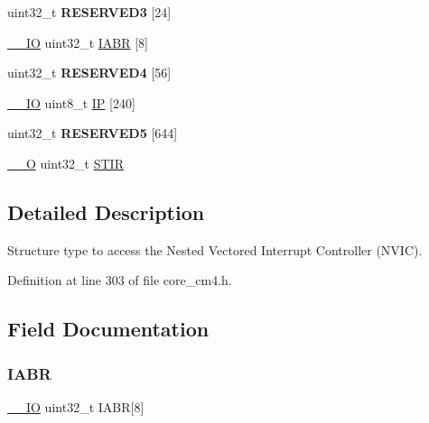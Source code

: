 \begin{DoxyCompactItemize}
\item 
\mbox{\label{struct_n_v_i_c___type_a3371761ff5e69fb1b6b3c2c3b4d69b18}} 
uint32\+\_\+t {\bfseries R\+E\+S\+E\+R\+V\+E\+D3} \mbox{[}24\mbox{]}
\item 
\hyperlink{group___c_m_s_i_s__core__definitions_gaec43007d9998a0a0e01faede4133d6be}{\+\_\+\+\_\+\+IO} uint32\+\_\+t \hyperlink{struct_n_v_i_c___type_ac8694e172f431db09b5d570993da3917}{I\+A\+BR} \mbox{[}8\mbox{]}
\item 
\mbox{\label{struct_n_v_i_c___type_a0c75e6c517dc8e5596ffa3ef6285c232}} 
uint32\+\_\+t {\bfseries R\+E\+S\+E\+R\+V\+E\+D4} \mbox{[}56\mbox{]}
\item 
\hyperlink{group___c_m_s_i_s__core__definitions_gaec43007d9998a0a0e01faede4133d6be}{\+\_\+\+\_\+\+IO} uint8\+\_\+t \hyperlink{struct_n_v_i_c___type_a38c377984f751265667317981f101bb4}{IP} \mbox{[}240\mbox{]}
\item 
\mbox{\label{struct_n_v_i_c___type_a77017390737a14d5eb4cdb41f0aa3dce}} 
uint32\+\_\+t {\bfseries R\+E\+S\+E\+R\+V\+E\+D5} \mbox{[}644\mbox{]}
\item 
\hyperlink{group___c_m_s_i_s__core__definitions_ga7e25d9380f9ef903923964322e71f2f6}{\+\_\+\+\_\+O} uint32\+\_\+t \hyperlink{struct_n_v_i_c___type_a471c399bb79454dcdfb342a31a5684ae}{S\+T\+IR}
\end{DoxyCompactItemize}


\subsection{Detailed Description}
Structure type to access the Nested Vectored Interrupt Controller (N\+V\+IC). 

Definition at line 303 of file core\+\_\+cm4.\+h.



\subsection{Field Documentation}
\mbox{\label{struct_n_v_i_c___type_ac8694e172f431db09b5d570993da3917}} 
\subsubsection{\texorpdfstring{I\+A\+BR}{IABR}}
{\footnotesize\ttfamily \hyperlink{group___c_m_s_i_s__core__definitions_gaec43007d9998a0a0e01faede4133d6be}{\+\_\+\+\_\+\+IO} uint32\+\_\+t I\+A\+BR\mbox{[}8\mbox{]}}

